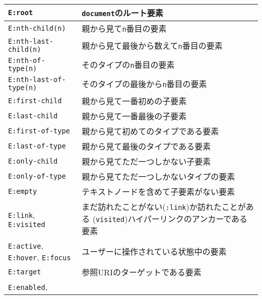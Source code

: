 \begin{longtable}{|m{13em}|m{}|}
\\\hline
\verb+E:root+&\texttt{document}のルート要素%
\\\hline
\verb+E:nth-child(n)+&親から見て\texttt{n}番目の要素%
\\\hline
\verb+E:nth-last-child(n)+&親から見て最後から数えて\texttt{n}番目の要素
\\\hline
\verb+E:nth-of-type(n)+&そのタイプの\texttt{n}番目の要素%
\\\hline
\verb+E:nth-last-of-type(n)+&そのタイプの最後から\texttt{n}番目の要素%
\\\hline
\verb+E:first-child+&親から見て一番初めの子要素%
\\\hline
\verb+E:last-child+&親から見て一番最後の子要素%
\\\hline
\verb+E:first-of-type+&親から見て初めてのタイプである要素%
\\\hline
\verb+E:last-of-type+&親から見て最後のタイプである要素%
\\\hline
\verb+E:only-child+&親から見てただ一つしかない子要素%
\\\hline
\verb+E:only-of-type+&親から見てただ一つしかないタイプの要素%
\\\hline
\verb+E:empty+&テキストノードを含めて子要素がない要素%
\\\hline
\verb+E:link+, %
\verb+E:visited+&まだ訪れたことがない(\texttt{:link})か訪れたことがある
     (\texttt{visited})ハイパーリンクのアンカーである要素%
\\\hline
\verb+E:active+, %
\verb+E:hover+, %
\verb+E:focus+&ユーザーに操作されている状態中の要素%
\\\hline
\verb+E:target+&参照URIのターゲットである要素%
\\\hline
\verb+E:enabled+, %

\end{longtable}
